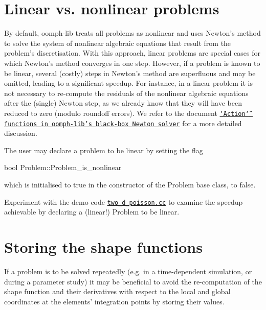  

\hypertarget{index_linear_vs_nonlinear}{}\section{Linear vs. nonlinear problems}\label{index_linear_vs_nonlinear}
By default, {\ttfamily oomph-\/lib} treats all problems as nonlinear and uses Newton's method to solve the system of nonlinear algebraic equations that result from the problem's discretisation. With this approach, linear problems are special cases for which Newton's method converges in one step. However, if a problem is known to be linear, several (costly) steps in Newton's method are superfluous and may be omitted, leading to a significant speedup. For instance, in a linear problem it is not necessary to re-\/compute the residuals of the nonlinear algebraic equations after the (single) Newton step, as we already know that they will have been reduced to zero (modulo roundoff errors). We refer to the document \href{../../order_of_action_functions/html/index.html}{\tt \char`\"{}\-Action\char`\"{} functions in oomph-\/lib's black-\/box Newton solver} for a more detailed discussion.

The user may declare a problem to be linear by setting the flag 
\begin{DoxyCode}
\textcolor{keywordtype}{bool} Problem::Problem\_is\_nonlinear
\end{DoxyCode}
 which is initialised to {\ttfamily true} in the constructor of the {\ttfamily Problem} base class, to {\ttfamily false}.

Experiment with the demo code \href{../../../demo_drivers/optimisation/linear_vs_nonlinear/two_d_poisson.cc}{\tt two\-\_\-d\-\_\-poisson.\-cc} to examine the speedup achievable by declaring a (linear!) Problem to be linear.



 

\hypertarget{index_store_shape}{}\section{Storing the shape functions}\label{index_store_shape}
If a problem is to be solved repeatedly (e.\-g. in a time-\/dependent simulation, or during a parameter study) it may be beneficial to avoid the re-\/computation of the shape function and their derivatives with respect to the local and global coordinates at the elements' integration points by storing their values.

